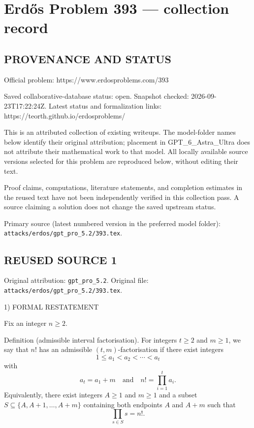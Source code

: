 \section*{Erd\H{o}s Problem 393 --- collection record}

\subsection*{PROVENANCE AND STATUS}
Official problem: https://www.erdosproblems.com/393

Saved collaborative-database status: open.
Snapshot checked: 2026-09-23T17:22:24Z.
Latest status and formalization links: https://teorth.github.io/erdosproblems/

This is an attributed collection of existing writeups. The model-folder names below identify their original attribution; placement in GPT\_6\_Astra\_Ultra does not attribute their mathematical work to that model. All locally available source versions selected for this problem are reproduced below, without editing their text.

Proof claims, computations, literature statements, and completion estimates in the reused text have not been independently verified in this collection pass. A source claiming a solution does not change the saved upstream status.

Primary source (latest numbered version in the preferred model folder): \texttt{attacks/erdos/gpt\_pro\_5.2/393.tex}.

\subsection*{REUSED SOURCE 1}
Original attribution: \texttt{gpt\_pro\_5.2}.
Original file: \texttt{attacks/erdos/gpt\_pro\_5.2/393.tex}.


1) FORMAL RESTATEMENT

Fix an integer $n\ge 2$.

Definition (admissible interval factorisation).
For integers $t\ge 2$ and $m\ge 1$, we say that $n!$ has an admissible $(t,m)$-factorisation if there exist integers
\[
1\le a_1 < a_2 < \cdots < a_t
\]
with
\[
a_t=a_1+m\quad\text{and}\quad n! = \prod_{i=1}^t a_i.
\]
Equivalently, there exist integers $A\ge 1$ and $m\ge 1$ and a subset $S\subseteq\{A,A+1,\dots,A+m\}$ containing both endpoints $A$ and $A+m$ such that
\[
\prod_{s\in S} s = n!.
\]

